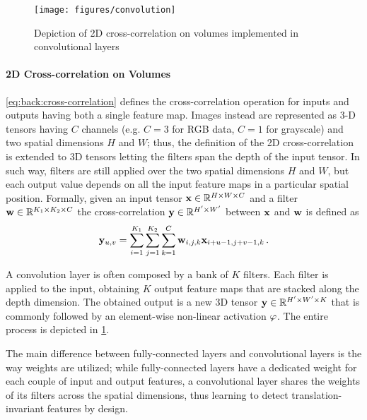 \begin{figure}
    \centering
    \texttt{[image: figures/convolution]}
    \caption{Depiction of 2D cross-correlation on volumes implemented in convolutional layers}
    \label{fig:back:convolution}
\end{figure}

\paragraph{2D Cross-correlation on Volumes}
\ref{eq:back:cross-correlation} defines the cross-correlation operation for inputs and outputs having both a single feature map.
Images instead are represented as 3-D tensors having $C$ channels (e.g. $C=3$ for RGB data, $C=1$ for grayscale) and two spatial dimensions $H$ and $W$;
thus, the definition of the 2D cross-correlation is extended to 3D tensors letting the filters span the depth of the input tensor.
In such way, filters are still applied over the two spatial dimensions $H$ and $W$, but each output value depends on all the input feature maps in a particular spatial position.
Formally, given an input tensor $\mathbf{x} \in \mathbb{R}^{H \times W \times C}$ and a filter $\mathbf{w} \in \mathbb{R}^{K_1 \times K_2 \times C}$ the cross-correlation $\mathbf{y} \in \mathbb{R}^{H' \times W'}$ between $\mathbf{x}$ and $\mathbf{w}$ is defined as
%
\begin{equation}\label{eq:back:channel-cross-correlation}
    \mathbf{y}_{u,v} = \sum_{i=1}^{K_1} \sum_{j=1}^{K_2} \sum_{k=1}^C \mathbf{w}_{i,j,k} \mathbf{x}_{i+u-1,j+v-1,k} \,.
\end{equation}

A convolution layer is often composed by a bank of $K$ filters.
Each filter is applied to the input, obtaining $K$ output feature maps that are stacked along the depth dimension.
The obtained output is a new 3D tensor $\mathbf{y} \in \mathbb{R}^{H' \times W' \times K}$ that is commonly followed by an element-wise non-linear activation $\varphi$.
The entire process is depicted in \ref{fig:back:convolution}.

The main difference between fully-connected layers and convolutional layers is the way weights are utilized;
while fully-connected layers have a dedicated weight for each couple of input and output features, a convolutional layer shares the weights of its filters across the spatial dimensions, thus learning to detect translation-invariant features by design.

